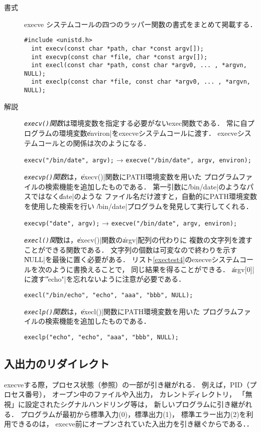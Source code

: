 \begin{description}
\item[書式]
  execve システムコールの四つのラッパー関数の書式をまとめて掲載する．
\begin{lstlisting}[numbers=none]
  #include <unistd.h>
  int execv(const char *path, char *const argv[]);
  int execvp(const char *file, char *const argv[]);
  int execl(const char *path, const char *argv0, ... , *argvn, NULL);
  int execlp(const char *file, const char *argv0, ... , *argvn, NULL);
\end{lstlisting}

\item [解説]
  \emph{\texttt{execv()}関数}は環境変数を指定する必要がないexec関数である．
  常に自プログラムの環境変数\|environ|をexecveシステムコールに渡す．
  execveシステムコールとの関係は次のようになる．

  \centerline{\texttt{execv("/bin/date", argv);}
    →  \texttt{execve("/bin/date", argv, environ);}}

  \emph{\texttt{execvp()}関数}は，\|execv()|関数にPATH環境変数を用いた
  プログラムファイルの検索機能を追加したものである．
  第一引数に\|/bin/date|のようなパスではなく\|date|のような
  ファイル名だけ渡すと，自動的にPATH環境変数を使用した検索を行い
  \|/bin/date|プログラムを発見して実行してくれる．
  
  \centerline{\texttt{execvp("date", argv);}
    →  \texttt{execve("/bin/date", argv, environ);}}

  \emph{\texttt{execl()}関}数は，\|execv()|関数の\|argv|配列の代わりに
  複数の文字列を渡すことができる関数である．
  文字列の個数は可変なので終わりを示す\| NULL|を最後に置く必要がある．
  リスト\ref{exectest4}のexecveシステムコールを次のように書換えることで，
  同じ結果を得ることができる．
  \|argv[0]|に渡す\|"echo"|を忘れないように注意が必要である．

  \centerline{\texttt{execl("/bin/echo", "echo", "aaa", "bbb", NULL);}}

  \emph{\texttt{execlp()}関数}は，\|execl()|関数にPATH環境変数を用いた
  プログラムファイルの検索機能を追加したものである．

  \centerline{\texttt{execlp("echo", "echo", "aaa", "bbb", NULL);}}

\end{description}

\subsection{入出力のリダイレクト}
execveする際，プロセス状態（参照）の一部が引き継がれる．
例えば，PID（プロセス番号），
オープン中のファイルや入出力，
カレントディレクトリ，
「無視」に設定されたシグナルハンドリング等は，
新しいプログラムに引き継がれる．
プログラムが最初から標準入力(0)，標準出力(1)，
標準エラー出力(2)を利用できるのは，
execve前にオープンされていた入出力を引き継ぐからである．．

